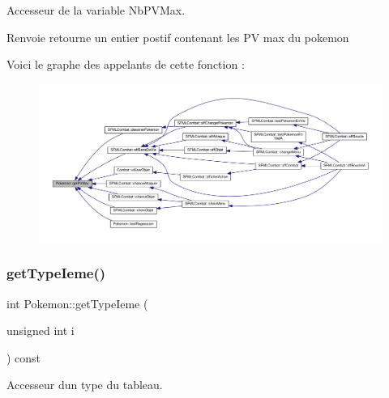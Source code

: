Accesseur de la variable Nb\+P\+V\+Max. 

\begin{DoxyReturn}{Renvoie}
retourne un entier postif contenant les PV max du pokemon 
\end{DoxyReturn}
Voici le graphe des appelants de cette fonction \+:\nopagebreak
\begin{figure}[H]
\begin{center}
\leavevmode
\includegraphics[width=350pt]{class_pokemon_af11b525fb21bb7fbb86c43d1ddad738a_icgraph}
\end{center}
\end{figure}
\mbox{\label{class_pokemon_a3d9cc7fe1b38d8d8ea3ef499116c0eac}} 
\subsubsection{\texorpdfstring{get\+Type\+Ieme()}{getTypeIeme()}}
{\footnotesize\ttfamily int Pokemon\+::get\+Type\+Ieme (\begin{DoxyParamCaption}\item[{unsigned int}]{i }\end{DoxyParamCaption}) const}



Accesseur d\textquotesingle{}un type du tableau. 


